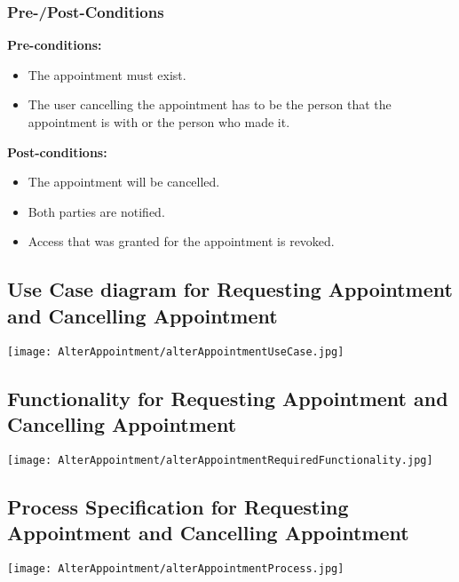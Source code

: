 \subsubsection{Pre-/Post-Conditions}
\textbf{Pre-conditions:} 
	\begin{itemize}
		\item The appointment must exist.
		\item The user cancelling the appointment has to be the person that the appointment is with or the person who made it.
	\end{itemize}
\textbf{Post-conditions:} 
	\begin{itemize}
		\item The appointment will be cancelled.
		\item  Both parties are notified.
		\item Access that was granted for the appointment is revoked. 
	\end{itemize}

\subsection{Use Case diagram for Requesting Appointment and Cancelling Appointment}
	\texttt{[image: AlterAppointment/alterAppointmentUseCase.jpg]}
	
\subsection{Functionality for Requesting Appointment and Cancelling Appointment}
	\texttt{[image: AlterAppointment/alterAppointmentRequiredFunctionality.jpg]}
	
\subsection{Process Specification for Requesting Appointment and Cancelling Appointment}
	\texttt{[image: AlterAppointment/alterAppointmentProcess.jpg]}

